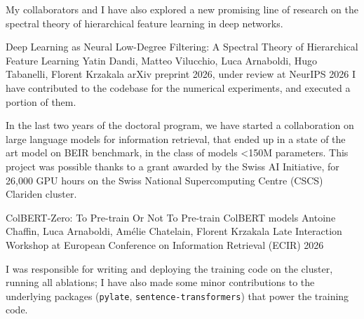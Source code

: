 My collaborators and I have also explored a new promising line of research on the spectral theory of hierarchical feature learning in deep networks.
\begin{contribution}
  {Deep Learning as Neural Low-Degree Filtering: A Spectral Theory of
   Hierarchical Feature Learning}
  {Yatin Dandi, Matteo Vilucchio, Luca Arnaboldi, Hugo Tabanelli, Florent Krzakala}
  {arXiv preprint 2026, under review at NeurIPS 2026}
  {}
  I have contributed to the codebase for the numerical experiments, and executed a portion of them.
\end{contribution}

In the last two years of the doctoral program, we have started a collaboration on large language models for information retrieval, that ended up in a state of the art model on BEIR benchmark, in the class of models <150M parameters.
This project was possible thanks to a grant awarded by the Swiss AI Initiative, for 26,000 GPU hours on the Swiss National Supercomputing Centre (CSCS) Clariden cluster.
\begin{contribution}
  {ColBERT-Zero: To Pre-train Or Not To Pre-train ColBERT models}
  {Antoine Chaffin, Luca Arnaboldi, Am\'{e}lie Chatelain, Florent Krzakala}
  {Late Interaction Workshop at European Conference on Information Retrieval (ECIR) 2026}
  {\begin{sloppypar}\end{sloppypar}}
  I was responsible for writing and deploying the training code on the cluster, running all ablations; I have also made some minor contributions to the underlying packages (\texttt{pylate}, \texttt{sentence-transformers}) that power the training code.
\end{contribution}


